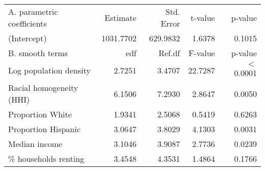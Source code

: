 \begin{table}[ht]
\centering
\begin{tabular}{lrrrr}
   \hline
A. parametric coefficients & Estimate & Std. Error & t-value & p-value \\ 
  (Intercept) & 1031.7702 & 629.9832 & 1.6378 & 0.1015 \\ 
   \hline
B. smooth terms & edf & Ref.df & F-value & p-value \\ 
  Log population density & 2.7251 & 3.4707 & 22.7287 & $<$ 0.0001 \\ 
  Racial homogeneity (HHI) & 6.1506 & 7.2930 & 2.8647 & 0.0050 \\ 
  Proportion White & 1.9341 & 2.5068 & 0.5419 & 0.6263 \\ 
  Proportion Hispanic & 3.0647 & 3.8029 & 4.1303 & 0.0031 \\ 
  Median income & 3.1046 & 3.9087 & 2.7736 & 0.0239 \\ 
  \% households renting & 3.4548 & 4.3531 & 1.4864 & 0.1766 \\ 
   \hline
\end{tabular}
\caption{ } 
\label{Demographic GAM}
\end{table}
